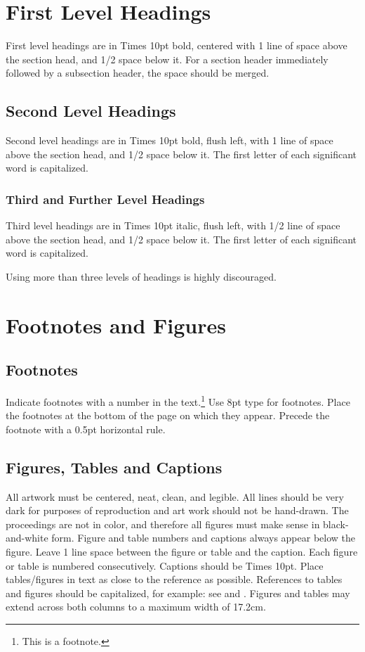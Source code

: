 \documentclass{article}
\begin{document}
\section{First Level Headings}

First level headings are in Times 10pt bold,
centered with 1 line of space above the section head, and 1/2 space below it.
For a section header immediately followed by a subsection header, the space should be merged.

\subsection{Second Level Headings}

Second level headings are in Times 10pt bold, flush left,
with 1 line of space above the section head, and 1/2 space below it.
The first letter of each significant word is capitalized.

\subsubsection{Third and Further Level Headings}

Third level headings are in Times 10pt italic, flush left,
with 1/2 line of space above the section head, and 1/2 space below it.
The first letter of each significant word is capitalized.

Using more than three levels of headings is highly discouraged.

\section{Footnotes and Figures}

\subsection{Footnotes}

Indicate footnotes with a number in the text.\footnote{This is a footnote.}
Use 8pt type for footnotes. Place the footnotes at the bottom of the page on which they appear.
Precede the footnote with a 0.5pt horizontal rule.

\subsection{Figures, Tables and Captions}

All artwork must be centered, neat, clean, and legible.
All lines should be very dark for purposes of reproduction and art work should not be hand-drawn.
The proceedings are not in color, and therefore all figures must make sense in black-and-white form.
Figure and table numbers and captions always appear below the figure.
Leave 1 line space between the figure or table and the caption.
Each figure or table is numbered consecutively. Captions should be Times 10pt.
Place tables/figures in text as close to the reference as possible.
References to tables and figures should be capitalized, for example:
see  and .
Figures and tables may extend across both columns to a maximum width of 17.2cm.
\end{document}
